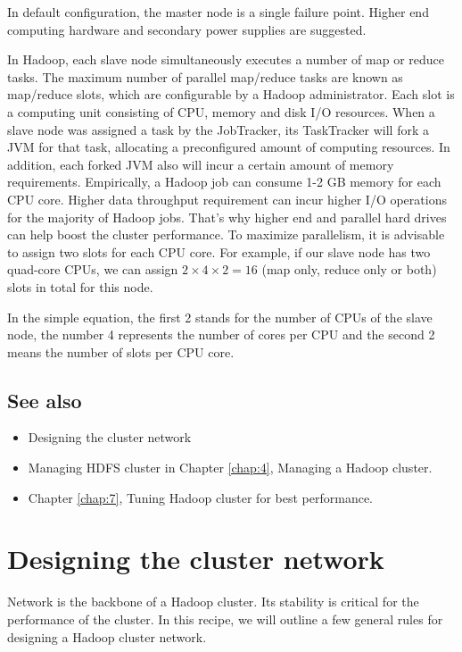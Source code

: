 In default configuration, the master node is a single failure point. Higher end computing hardware and secondary power supplies are suggested.

In Hadoop, each slave node simultaneously executes a number of map or reduce tasks. The maximum number of parallel map/reduce tasks are known as map/reduce slots, which are configurable by a Hadoop administrator. Each slot is a computing unit consisting of CPU, memory and disk I/O resources. When a slave node was assigned a task by the JobTracker, its TaskTracker will fork a JVM for that task, allocating a preconfigured amount of computing resources. In addition, each forked JVM also will incur a certain amount of memory requirements. Empirically, a Hadoop job can consume 1-2 GB memory for each CPU core. Higher data throughput requirement can incur higher I/O operations for the majority of Hadoop jobs. That's why higher end and parallel hard drives can help boost the cluster performance. To maximize parallelism, it is advisable to assign two slots for each CPU core. For example, if our slave node has two quad-core CPUs, we can assign $2 \times 4 \times 2 = 16$ (map only, reduce only or both) slots in total for this node.

In the simple equation, the first 2 stands for the number of CPUs of the slave node, the number 4 represents the number of cores per CPU and the second 2 means the number of slots per CPU core.
\subsection*{See also}
\begin{itemize}
  \item Designing the cluster network
  \item Managing HDFS cluster in Chapter \ref{chap:4}, Managing a Hadoop cluster.
  \item Chapter \ref{chap:7}, Tuning Hadoop cluster for best performance.
\end{itemize}

\section{Designing the cluster network}
Network is the backbone of a Hadoop cluster. Its stability is critical for the performance of the cluster. In this recipe, we will outline a few general rules for designing a Hadoop cluster network.
